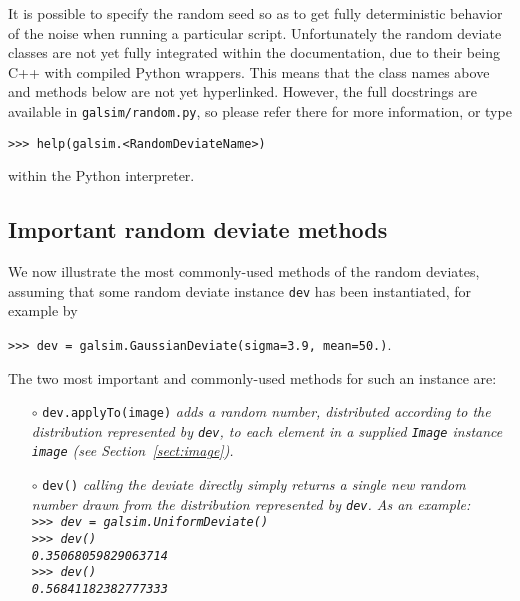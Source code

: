 \documentclass[preprint,11pt]{aastex}
\begin{document}
It is possible to specify the random seed so as to get fully
deterministic behavior of the noise when running a particular script.
Unfortunately the random deviate classes are not yet fully integrated
within the documentation, due to their being C++ with compiled Python
wrappers.  This means that the class names above and methods below are
not yet hyperlinked.  However, the full docstrings are available in
\texttt{galsim/random.py}, so please refer there for more information,
or type

{\tt >>> help(galsim.<RandomDeviateName>)}

within the Python interpreter.

\subsection{Important random deviate methods}\label{sect:randommethods}
We now illustrate the most commonly-used methods of the random
deviates, assuming that some random deviate instance \texttt{dev} has
been instantiated, for example by

{\tt >>> dev = galsim.GaussianDeviate(sigma=3.9, mean=50.)}.

The two most important and commonly-used methods for such an
instance are:
\begin{itemize}

\item[$\circ$] \texttt{dev.applyTo(image)} \newline \emph{adds a
    random number, distributed according to the distribution
    represented by \texttt{dev}, to each element in a supplied
    \texttt{Image} instance \texttt{image} (see
    Section~\ref{sect:image}).}

\item[$\circ$] \texttt{dev()} \newline \emph{calling the deviate
    directly simply returns a single new random number drawn from the
    distribution
    represented by \texttt{dev}.  As an example:\newline \\
    {\tt >>> dev = galsim.UniformDeviate()}\\
    {\tt >>> dev()} \\
    {\tt 0.35068059829063714} \\
    {\tt >>> dev() }\\
    {\tt 0.56841182382777333}}

\end{itemize}
\end{document}
